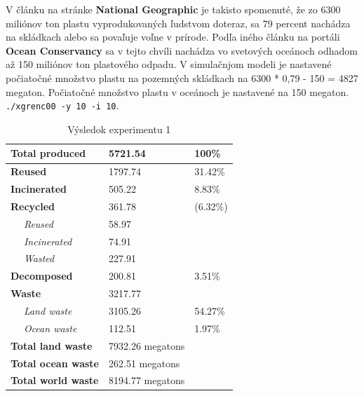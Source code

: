 \documentclass[a4paper, 11pt]{article}
\begin{document}
V článku na stránke \textbf{National Geographic} \cite{plastic_recyclation_NATGEO} je takisto spomenuté, že zo 6300 miliónov ton plastu vyprodukovaných ľudstvom doteraz, sa 79 percent nachádza na skládkach alebo sa povaľuje voľne v prírode. Podľa iného článku na portáli \textbf{Ocean Conservancy} \cite{ocean_conservancy} sa v tejto chvíli nachádza vo svetových oceánoch odhadom až 150 miliónov ton plastového odpadu. V simulačnjom modeli je nastavené počiatočné množstvo plastu na pozemných skládkach na 6300 * 0,79 - 150 = 4827 megaton. Počiatočné množstvo plastu v oceánoch je nastavené na 150 megaton.
\texttt{./xgrenc00 -y 10 -i 10}.

\begin{table}[ht]
	\centering
	\begin{tabular}{|l|l|l|l|}
		\hline
		\multicolumn{2}{|l|}{\textbf{Total produced}}    & 5721.54              & 100\%              \\ \hline
		\multicolumn{2}{|l|}{\textbf{Reused}}            & 1797.74              & 31.42\%            \\ \hline
		\multicolumn{2}{|l|}{\textbf{Incinerated}}       & 505.22               & 8.83\%             \\ \hline
		\multicolumn{2}{|l|}{\textbf{Recycled}}          & 361.78               & (6.32\%)           \\ \hline
		                                                 & \textit{Reused}      & 58.97    &         \\ \hline
		                                                 & \textit{Incinerated} & 74.91    &         \\ \hline
		                                                 & \textit{Wasted}      & 227.91   &         \\ \hline
		\multicolumn{2}{|l|}{\textbf{Decomposed}}        & 200.81               & 3.51\%             \\ \hline
		\multicolumn{2}{|l|}{\textbf{Waste}}             & 3217.77              &                    \\ \hline
		                                                 & \textit{Land waste}  & 3105.26  & 54.27\% \\ \hline
		                                                 & \textit{Ocean waste} & 112.51   & 1.97\%  \\ \hline
		\multicolumn{2}{|l|}{\textbf{Total land waste}}  & 7932.26 megatons     &                    \\ \hline
		\multicolumn{2}{|l|}{\textbf{Total ocean waste}} & 262.51 megatons      &                    \\ \hline
		\multicolumn{2}{|l|}{\textbf{Total world waste}} & 8194.77 megatons     &                    \\ \hline
	\end{tabular}
	\caption{Výsledok experimentu 1}
	\label{tab:1}
\end{table}
\end{document}
